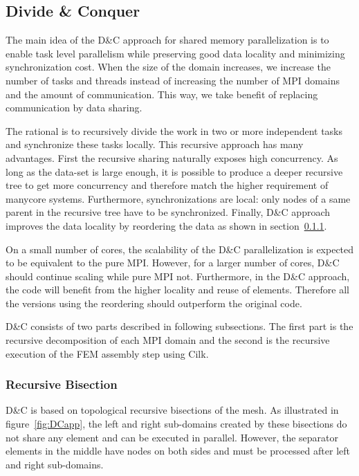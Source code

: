 \documentclass[10pt]{IOS-Book-Article}
\begin{document}
\subsection{Divide \& Conquer}

The main idea of the D\&C approach for shared memory parallelization is to enable task level parallelism while preserving good data locality and minimizing synchronization cost.
When the size of the domain increases, we increase the number of tasks and threads instead of increasing the number of MPI domains and the amount of communication.
This way, we take benefit of replacing communication by data sharing.

The rational is to  recursively divide the work in two or more independent tasks and synchronize these tasks locally. This recursive approach has many advantages.
First the recursive sharing naturally exposes high concurrency. As long as the data-set is large enough, it is possible to produce a deeper recursive tree to get more concurrency and 
therefore match the higher requirement of manycore systems. Furthermore, synchronizations are local: only nodes of a same parent in the recursive tree have to be synchronized.
Finally, D\&C approach improves the data locality by reordering the data as shown in section~\ref{sec:DCrec}.

On a small number of cores, the scalability of the D\&C parallelization is expected to be equivalent to the pure MPI.
However, for a larger number of cores, D\&C should continue scaling while pure MPI not.
Furthermore, in the D\&C approach, the code will benefit from the higher locality and reuse of elements. Therefore all the versions using the reordering should outperform the original code.

D\&C consists of two parts described in following subsections.
The first part is the recursive decomposition of each MPI domain and the second is the recursive execution of the FEM assembly step using Cilk.

\subsubsection{Recursive Bisection}
\label{sec:DCrec}
D\&C is based on topological recursive bisections of the mesh.
As illustrated in figure~\ref{fig:DCapp}, the left and right sub-domains created by these bisections do not share any element and can be executed in parallel.
However, the separator elements in the middle have nodes on both sides and must be processed after left and right sub-domains.
\end{document}
